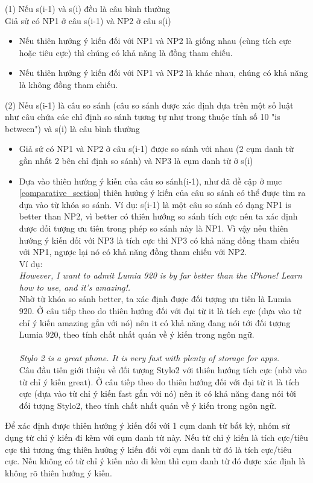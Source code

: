 \documentclass[12pt]{extarticle}
\begin{document}
				\par (1) Nếu s(i-1) và s(i) đều là câu bình thường 
				\\Giả sử có NP1 ở câu s(i-1) và NP2 ở câu s(i)
				\begin{itemize}
					\item{Nếu thiên hướng ý kiến đối với NP1 và NP2 là giống nhau (cùng tích cực hoặc tiêu cực) thì chúng có khả năng là đồng tham chiếu.}
					\item{Nếu thiên hướng ý kiến đối với NP1 và NP2 là khác nhau, chúng có khả năng là không đồng tham chiếu.}
				\end{itemize}
				(2)	Nếu s(i-1) là câu so sánh (câu so sánh được xác định dựa trên một số luật như câu chứa các chỉ định so sánh tương tự như trong thuộc tính số 10 "is between") và s(i) là câu bình thường
				\begin{itemize}
					\item{Giả sử có NP1 và NP2 ở câu s(i-1) được so sánh với nhau (2 cụm danh từ gần nhất 2 bên chỉ định so sánh) và NP3 là cụm danh từ ở s(i)}
					\item{Dựa vào thiên hướng ý kiến của câu so sánh(i-1), như đã đề cập ở mục \ref{comparative_section} thiên hướng ý kiến của câu so sánh có thể được tìm ra dựa vào từ khóa so sánh. Ví dụ: s(i-1) là một câu so sánh có dạng NP1 is better than NP2, vì better có thiên hướng so sánh tích cực nên ta xác định được đối tượng ưu tiên trong phép so sánh này là NP1. Vì vậy nếu thiên hướng ý kiến đối với NP3 là tích cực thì NP3 có khả năng đồng tham chiếu với NP1, ngược lại nó có khả năng đồng tham chiếu với NP2.
					\\ Ví dụ:
					\\\textit{However, I want to admit Lumia 920 is by far better than the iPhone! Learn how to use, and it's amazing!.} 
					\\Nhờ từ khóa so sánh better, ta xác định được đối tượng ưu tiên là Lumia 920. Ở câu tiếp theo do thiên hướng đối với đại từ it là tích cực (dựa vào từ chỉ ý kiến amazing gắn với nó) nên it có khả năng đang nói tới đối tượng Lumia 920, theo tính chất nhất quán về ý kiến trong ngôn ngữ.
					\\\\\textit{Stylo 2 is a great phone. It is very fast with plenty of storage for apps.}
					\\Câu đầu tiên giới thiệu về đối tượng Stylo2 với thiên hướng tích cực (nhờ vào từ chỉ ý kiến great). Ở câu tiếp theo do thiên hướng đối với đại từ it là tích cực (dựa vào từ chỉ ý kiến fast gắn với nó) nên it có khả năng đang nói tới đối tượng Stylo2, theo tính chất nhất quán về ý kiến trong ngôn ngữ.}
				\end{itemize}
				\par Để xác định được thiên hướng ý kiến đối với 1 cụm danh từ bất kỳ, nhóm sử dụng từ chỉ ý kiến đi kèm với cụm danh từ này. Nếu từ chỉ ý kiến là tích cực/tiêu cực thì tương ứng thiên hướng ý kiến đối với cụm danh từ đó là tích cực/tiêu cực. Nếu không có từ chỉ ý kiến nào đi kèm thì cụm danh từ đó được xác định là không rõ thiên hướng ý kiến.
\end{document}
